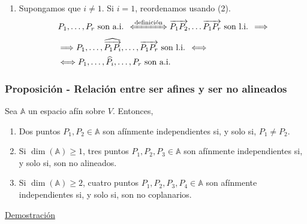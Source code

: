 \documentclass[12pt, a4paper, ones, notitlepage, openany,titlepage]{article}
\newcommand{\demostracion}{\noindent\underline{Demostración}}
\begin{document}
\begin{enumerate}[label=(\arabic*)]
	\item Supongamos que $i \neq 1$. Si $i = 1$, reordenamos usando (2).
	$$
	\begin{aligned}
		& P_1, \ldots, P_r \text{ son a.i. } \xLeftrightarrow{\text{definición}} \overrightarrow{P_1 P_2}, \ldots \overrightarrow{P_1 P_r} \text{ son l.i. } \Longrightarrow \\
		& \Longrightarrow P_1, \ldots, \widehat{\overrightarrow{P_1 P_i}}, \ldots, \overrightarrow{P_1 P_r} \text{ son l.i. } \Longleftrightarrow \\
		& \Longleftrightarrow P_1, \ldots, \widehat{P_i}, \ldots, P_r \text{ son a.i. }
	\end{aligned}
	$$
\end{enumerate}

\subsubsection{Proposición - Relación entre ser afines y ser no alineados}
\noindent Sea $\mathbb{A}$ un espacio afín sobre $V$. Entonces,
\begin{enumerate}[label=(\arabic*)]
	\item Dos puntos $P_1, P_2 \in \mathbb{A}$ son afínmente independientes si, y solo si, $P_1 \neq P_2$.
	\item Si $\dim(\mathbb{A}) \ge 1$, tres puntos $P_1, P_2, P_3 \in \mathbb{A}$ son afínmente independientes si, y solo si, son no alineados.
	\item Si $\dim(\mathbb{A}) \ge 2$, cuatro puntos $P_1, P_2, P_3, P_4 \in \mathbb{A}$ son afínmente independientes si, y solo si, son no coplanarios.
\end{enumerate}
\demostracion
\end{document}
